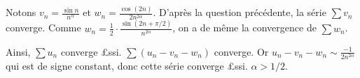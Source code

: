 \documentclass{yann}
\begin{document}
\begin{enumerate}
\begin{enumerate}
  Notons $v_n = \frac{\sin n}{n^α}$ et $w_n = \frac{\cos(2n)}{2n^{2α}}$.
  D'après la question précédente, la série $∑ v_n$ converge.
  Comme $w_n = \frac12 ⋅ \frac{\sin(2n+π/2)}{n^{2α}}$, on a de même la convergence de $∑ w_n$.

  Ainsi, $∑ u_n$ converge £ssi. $∑ (u_n - v_n - w_n)$ converge.
  Or $u_n - v_n - w_n \sim \frac{-1}{2n^{2α}}$ qui est de signe constant,
  donc cette série converge £ssi. $α > 1/2$.
\end{enumerate}
\end{enumerate}
\end{document}
